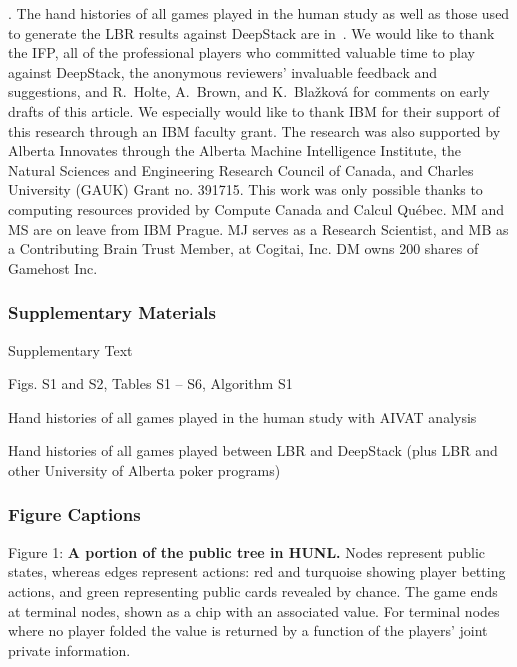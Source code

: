 \documentclass[12pt]{article}
\newif\iffinal
\newcounter{lastnote}
\newenvironment{scilastnote}{%
\setcounter{lastnote}{\value{enumiv}}%
\addtocounter{lastnote}{+1}%
\begin{list}%
{\arabic{lastnote}.}
{\setlength{\leftmargin}{.22in}}
{\setlength{\labelsep}{.5em}}}
{\end{list}}
\newenvironment{scilastnote}{\paragraph{Acknowledgements.}}{}
\newcommand{\HUNL}{{HUNL}}
\begin{document}
\begin{scilastnote}
The hand histories of all games played in the human study as well as those used to generate the LBR results against DeepStack are in~\cite{SOM}.
We would like to thank the IFP, all of the professional players who committed valuable time to play against DeepStack, the anonymous reviewers' invaluable feedback and suggestions, and
R.~Holte, A.~Brown, and K.~Bla\v{z}kov\'a for comments on early drafts of this article.
We especially would like to thank IBM for their support of this research through an IBM faculty grant.  
The research was also supported by Alberta Innovates through the Alberta Machine Intelligence Institute, the Natural Sciences and Engineering Research Council of Canada, and Charles University (GAUK) Grant no. 391715.  
This work was only possible thanks to computing resources provided by Compute Canada and Calcul Qu\'ebec.  
MM and MS are on leave from IBM Prague. MJ serves as a Research Scientist, and MB as a Contributing Brain Trust Member, at Cogitai, Inc. DM owns 200 shares of Gamehost Inc.
\end{scilastnote}

\iffinal
\subsubsection*{Supplementary Materials}

\begin{trivlist}
\item Supplementary Text
\item Figs. S1 and S2, Tables S1 -- S6, Algorithm S1
\item Hand histories of all games played in the human study with AIVAT analysis
\item Hand histories of all games played between LBR and DeepStack (plus LBR and other University of Alberta poker programs)
\end{trivlist}

\subsubsection*{Figure Captions}
\noindent 
Figure 1: 
{\bf A portion of the public tree in \HUNL{}.}  Nodes represent public states, whereas edges represent actions: red and turquoise showing player betting actions, and green representing public cards revealed by chance.  The game ends at terminal nodes, shown as a chip with an associated value.  For terminal nodes where no player folded the value is returned by a function of the players' joint private information.
\bigskip
\end{document}
